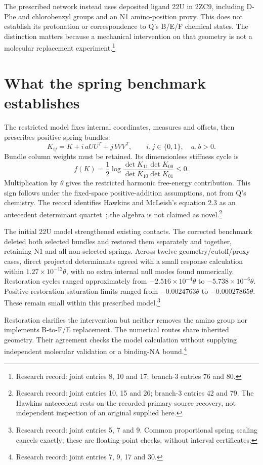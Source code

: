 \documentclass{article}
\begin{document}
The prescribed network instead uses deposited ligand 22U in 2ZC9, including D-Phe and chlorobenzyl groups and an N1 amino-position proxy. This does not establish its protonation or correspondence to Q's B/E/F chemical states. The distinction matters because a mechanical intervention on that geometry is not a molecular replacement experiment.\footnote{Research record: joint entries 8, 10 and 17; branch-3 entries 76 and 80.}

\section{What the spring benchmark establishes}
The restricted model fixes internal coordinates, measures and offsets, then prescribes positive spring bundles:
\[
 K_{ij}=K+i\,aUU^T+j\,bVV^T,\qquad i,j\in\{0,1\},\quad a,b>0.
\]
Bundle column weights must be retained. Its dimensionless stiffness cycle is
\[
 f(K)=\frac12\log\frac{\det K_{11}\det K_{00}}
 {\det K_{10}\det K_{01}}\le0.
\]
Multiplication by \(\theta\) gives the restricted harmonic free-energy contribution. This sign follows under the fixed-space positive-addition assumptions, not from Q's chemistry. The record identifies Hawkins and McLeish's equation 2.3 as an antecedent determinant quartet~\cite{Hawkins}; the algebra is not claimed as novel.\footnote{Research record: joint entries 10, 15 and 26; branch-3 entries 42 and 79. The Hawkins antecedent rests on the recorded primary-source recovery, not independent inspection of an original supplied here.}

The initial 22U model strengthened existing contacts. The corrected benchmark deleted both selected bundles and restored them separately and together, retaining N1 and all non-selected springs. Across twelve geometry/cutoff/proxy cases, direct projected determinants agreed with a small response calculation within \(1.27\times10^{-12}\theta\), with no extra internal null modes found numerically. Restoration cycles ranged approximately from \(-2.516\times10^{-4}\theta\) to \(-5.738\times10^{-6}\theta\). Positive-restoration saturation limits ranged from \(-0.0024763\theta\) to \(-0.00027865\theta\). These remain small within this prescribed model.\footnote{Research record: joint entries 5, 7 and 9. Common proportional spring scaling cancels exactly; these are floating-point checks, without interval certificates.}

Restoration clarifies the intervention but neither removes the amino group nor implements B-to-F/E replacement. The numerical routes share inherited geometry. Their agreement checks the model calculation without supplying independent molecular validation or a binding-NA bound.\footnote{Research record: joint entries 7, 9, 17 and 30.}
\end{document}
